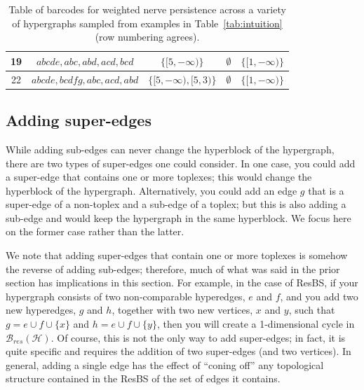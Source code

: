 \documentclass{amsart}
\renewcommand{\H}{\mathcal{H}}
\newcommand{\bary}{\mathcal{B}}
\newcommand{\cLZ}[1]{{\textcolor{magenta}{[Comment from Lori: #1]}}}
\begin{document}
\begin{table}
{\begin{tabular}{c|c||ccc}
\hline
19 & $abcde,abc, abd, acd, bcd$  & $\{[5,-\infty)\}$ & $\emptyset$ & $\{[1,-\infty)\}$\\
\hline
22 & $abcde,bcdfg,abc,acd,abd$ & $\{[5,-\infty),[5,3)\}$ & $\emptyset$ & $\{[1,-\infty)\}$\\
\end{tabular}
}
\caption{Table of barcodes for weighted nerve persistence across a variety of hypergraphs sampled from examples in Table~\ref{tab:intuition} (row numbering agrees).} %
\label{tab:intuitionBarCode}
\end{table}

\subsection{Adding super-edges}
While adding sub-edges can never change the hyperblock of the hypergraph, there are two types of super-edges one could consider. 
In one case, you could add a super-edge that contains one or more toplexes; this would change the hyperblock of the hypergraph.
Alternatively, you could add an edge $g$ that is a super-edge of a non-toplex and a sub-edge of a toplex; but this is also adding a sub-edge and would keep the hypergraph in the same hyperblock. We focus here on the former case rather than the latter.

We note that adding super-edges that contain one or more toplexes is somehow the reverse of adding sub-edges; therefore, much of what was said in the prior section has implications in this section. For example, in the case of ResBS, if your hypergraph consists of two non-comparable hyperedges, $e$ and $f$, and you add two new hyperedges, $g$ and $h$, together with two new vertices, $x$ and $y$, such that $g=e\cup f \cup \{x\}$ and $h=e \cup f \cup \{y\}$, then you will create a 1-dimensional cycle in $\bary_{res}(\H)$. Of course, this is not the only way to add super-edges; in fact, it is quite specific and requires the addition of two super-edges (and two vertices). In general, adding a single edge has the effect of ``coning off'' any topological structure contained in the ResBS of the set of edges it contains. 
\end{document}
